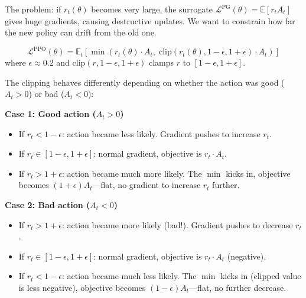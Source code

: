 The problem: if $r_t(\theta)$ becomes very large, the surrogate $\mathcal{L}^{\text{PG}}(\theta) = \mathbb{E}[r_t A_t]$ gives huge gradients, causing destructive updates. We want to constrain how far the new policy can drift from the old one.

\begin{definition}
    \[
        \mathcal{L}^{\text{PPO}}(\theta) = \mathbb{E}_t \left[ \min\left( r_t(\theta) \cdot A_t, \; \text{clip}(r_t(\theta), 1-\epsilon, 1+\epsilon) \cdot A_t \right) \right]
    \]
    where $\epsilon \approx 0.2$ and $\text{clip}(r, 1-\epsilon, 1+\epsilon)$ clamps $r$ to $[1-\epsilon, 1+\epsilon]$.
\end{definition}

\begin{remark}
    The clipping behaves differently depending on whether the action was good ($A_t > 0$) or bad ($A_t < 0$):

    \textbf{Case 1: Good action ($A_t > 0$)}
    \begin{itemize}
        \item If $r_t < 1 - \epsilon$: action became less likely. Gradient pushes to increase $r_t$.
        \item If $r_t \in [1-\epsilon, 1+\epsilon]$: normal gradient, objective is $r_t \cdot A_t$.
        \item If $r_t > 1 + \epsilon$: action became much more likely. The $\min$ kicks in, objective becomes $(1+\epsilon) A_t$---flat, no gradient to increase $r_t$ further.
    \end{itemize}

    \textbf{Case 2: Bad action ($A_t < 0$)}
    \begin{itemize}
        \item If $r_t > 1 + \epsilon$: action became more likely (bad!). Gradient pushes to decrease $r_t$.
        \item If $r_t \in [1-\epsilon, 1+\epsilon]$: normal gradient, objective is $r_t \cdot A_t$ (negative).
        \item If $r_t < 1 - \epsilon$: action became much less likely. The $\min$ kicks in (clipped value is less negative), objective becomes $(1-\epsilon) A_t$---flat, no further decrease.
    \end{itemize}
\end{remark}

